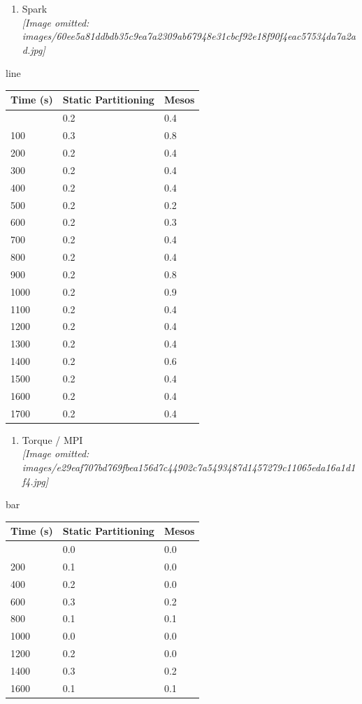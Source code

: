 \documentclass[
]{article}
\newcounter{none} %
\providecommand{\tightlist}{%
  \setlength{\itemsep}{0pt}\setlength{\parskip}{0pt}}
\begin{document}
\begin{enumerate}
\def\labelenumi{(\alph{enumi})}
\setcounter{enumi}{2}
\tightlist
\item
  Spark\\
  \textit{[Image omitted: images/60ee5a81ddbdb35c9ea7a2309ab67948e31cbcf92e18f90f4eac57534da7a2ad.jpg]}
\end{enumerate}

line

{\def\LTcaptype{none} %
\begin{longtable}[]{@{}lll@{}}
\toprule\noalign{}
Time (s) & Static Partitioning & Mesos \\
\midrule\noalign{}
\endhead
\bottomrule\noalign{}
\endlastfoot
0 & 0.2 & 0.4 \\
100 & 0.3 & 0.8 \\
200 & 0.2 & 0.4 \\
300 & 0.2 & 0.4 \\
400 & 0.2 & 0.4 \\
500 & 0.2 & 0.2 \\
600 & 0.2 & 0.3 \\
700 & 0.2 & 0.4 \\
800 & 0.2 & 0.4 \\
900 & 0.2 & 0.8 \\
1000 & 0.2 & 0.9 \\
1100 & 0.2 & 0.4 \\
1200 & 0.2 & 0.4 \\
1300 & 0.2 & 0.4 \\
1400 & 0.2 & 0.6 \\
1500 & 0.2 & 0.4 \\
1600 & 0.2 & 0.4 \\
1700 & 0.2 & 0.4 \\
\end{longtable}
}

\begin{enumerate}
\def\labelenumi{(\alph{enumi})}
\setcounter{enumi}{3}
\tightlist
\item
  Torque / MPI\\
  \textit{[Image omitted: images/e29eaf707bd769fbea156d7c44902c7a5493487d1457279c11065eda16a1d1f4.jpg]}
\end{enumerate}

bar

{\def\LTcaptype{none} %
\begin{longtable}[]{@{}lll@{}}
\toprule\noalign{}
Time (s) & Static Partitioning & Mesos \\
\midrule\noalign{}
\endhead
\bottomrule\noalign{}
\endlastfoot
0 & 0.0 & 0.0 \\
200 & 0.1 & 0.0 \\
400 & 0.2 & 0.0 \\
600 & 0.3 & 0.2 \\
800 & 0.1 & 0.1 \\
1000 & 0.0 & 0.0 \\
1200 & 0.2 & 0.0 \\
1400 & 0.3 & 0.2 \\
1600 & 0.1 & 0.1 \\
\end{longtable}
}
\end{document}
